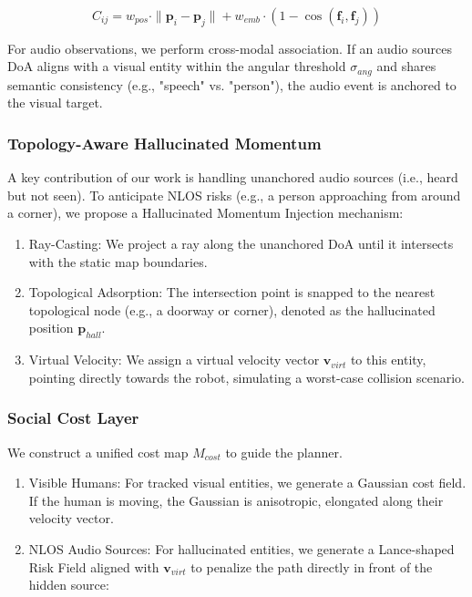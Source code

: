 \documentclass[
]{article}
\begin{document}
\[C_{ij} = w_{pos} \cdot \|\mathbf{p}_i - \mathbf{p}_j\| + w_{emb} \cdot (1 - \cos(\mathbf{f}_i, \mathbf{f}_j))\]

For audio observations, we perform cross-modal association. If an audio
source\textquotesingle s DoA aligns with a visual entity within the
angular threshold \(\sigma_{ang}\) and shares semantic consistency
(e.g., "speech" vs. "person"), the audio event is anchored to the visual
target.

\subsubsection{Topology-Aware Hallucinated
Momentum}\label{topology-aware-hallucinated-momentum}

A key contribution of our work is handling unanchored audio sources
(i.e., heard but not seen). To anticipate NLOS risks (e.g., a person
approaching from around a corner), we propose a Hallucinated Momentum
Injection mechanism:

\begin{enumerate}
\def\labelenumi{\arabic{enumi}.}
\item
  Ray-Casting: We project a ray along the unanchored DoA until it
  intersects with the static map boundaries.
\item
  Topological Adsorption: The intersection point is snapped to the
  nearest topological node (e.g., a doorway or corner), denoted as the
  hallucinated position \(\mathbf{p}_{hall}\).
\item
  Virtual Velocity: We assign a virtual velocity vector
  \(\mathbf{v}_{virt}\) to this entity, pointing directly towards the
  robot, simulating a worst-case collision scenario.
\end{enumerate}

\subsubsection{Social Cost Layer}\label{social-cost-layer}

We construct a unified cost map \(M_{cost}\) to guide the planner.

\begin{enumerate}
\def\labelenumi{\arabic{enumi}.}
\item
  Visible Humans: For tracked visual entities, we generate a Gaussian
  cost field. If the human is moving, the Gaussian is anisotropic,
  elongated along their velocity vector.
\item
  NLOS Audio Sources: For hallucinated entities, we generate a
  Lance-shaped Risk Field aligned with \(\mathbf{v}_{virt}\) to penalize
  the path directly in front of the hidden source:
\end{enumerate}
\end{document}
